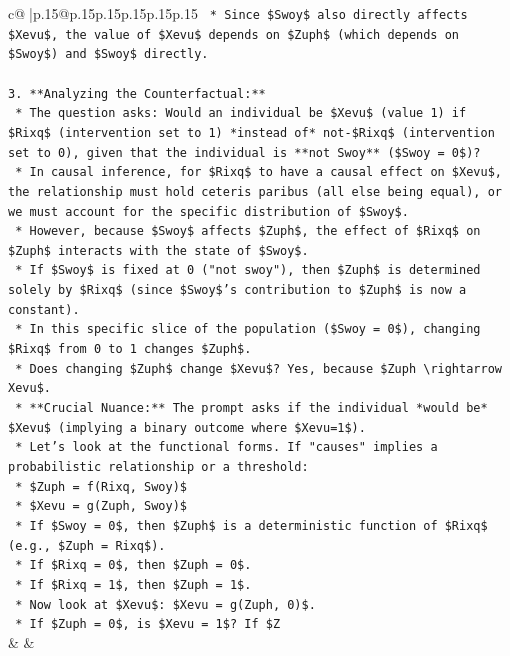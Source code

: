 \documentclass{article}
\begin{document}
{\begin{supertabular}{c@{$\;$}|p{.15\linewidth}@{}p{.15\linewidth}p{.15\linewidth}p{.15\linewidth}p{.15\linewidth}p{.15\linewidth}}
{{{\texttt{    *   Since \$Swoy\$ also directly affects \$Xevu\$, the value of \$Xevu\$ depends on \$Zuph\$ (which depends on \$Swoy\$) and \$Swoy\$ directly.} \\
\\ 
\texttt{3.  **Analyzing the Counterfactual:**} \\
\texttt{    *   The question asks: Would an individual be \$Xevu\$ (value 1) if \$Rixq\$ (intervention set to 1) *instead of* not{-}\$Rixq\$ (intervention set to 0), given that the individual is **not Swoy** (\$Swoy = 0\$)?} \\
\texttt{    *   In causal inference, for \$Rixq\$ to have a causal effect on \$Xevu\$, the relationship must hold ceteris paribus (all else being equal), or we must account for the specific distribution of \$Swoy\$.} \\
\texttt{    *   However, because \$Swoy\$ affects \$Zuph\$, the effect of \$Rixq\$ on \$Zuph\$ interacts with the state of \$Swoy\$.} \\
\texttt{    *   If \$Swoy\$ is fixed at 0 ("not swoy"), then \$Zuph\$ is determined solely by \$Rixq\$ (since \$Swoy\$'s contribution to \$Zuph\$ is now a constant).} \\
\texttt{    *   In this specific slice of the population (\$Swoy = 0\$), changing \$Rixq\$ from 0 to 1 changes \$Zuph\$.} \\
\texttt{    *   Does changing \$Zuph\$ change \$Xevu\$? Yes, because \$Zuph \textbackslash{}rightarrow Xevu\$.} \\
\texttt{    *   **Crucial Nuance:** The prompt asks if the individual *would be* \$Xevu\$ (implying a binary outcome where \$Xevu=1\$).} \\
\texttt{    *   Let's look at the functional forms. If "causes" implies a probabilistic relationship or a threshold:} \\
\texttt{        *   \$Zuph = f(Rixq, Swoy)\$} \\
\texttt{        *   \$Xevu = g(Zuph, Swoy)\$} \\
\texttt{    *   If \$Swoy = 0\$, then \$Zuph\$ is a deterministic function of \$Rixq\$ (e.g., \$Zuph = Rixq\$).} \\
\texttt{    *   If \$Rixq = 0\$, then \$Zuph = 0\$.} \\
\texttt{    *   If \$Rixq = 1\$, then \$Zuph = 1\$.} \\
\texttt{    *   Now look at \$Xevu\$: \$Xevu = g(Zuph, 0)\$.} \\
\texttt{    *   If \$Zuph = 0\$, is \$Xevu = 1\$? If \$Z} \\
            }
        }
    }
    & & \\ \\


\end{supertabular}}
\end{document}

